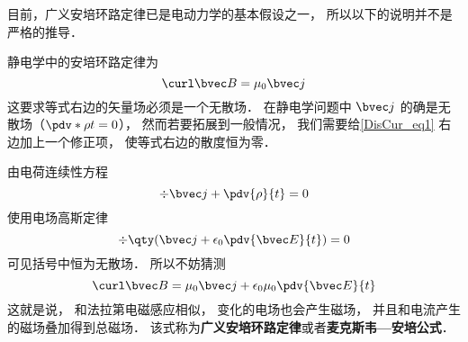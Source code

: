 目前，广义安培环路定律已是电动力学的基本假设之一， 所以以下的说明并不是严格的推导．

静电学中的安培环路定律为
\begin{equation}\label{DisCur_eq1}
\curl\bvec B = \mu_0\bvec j
\end{equation}
这要求等式右边的矢量场必须是一个无散场． 在静电学问题中 $\bvec j$ 的确是无散场（$\pdv*{\rho}{t} = 0$）， 然而若要拓展到一般情况， 我们需要给\autoref{DisCur_eq1} 右边加上一个修正项， 使等式右边的散度恒为零．

由电荷连续性方程
\begin{equation}
\div \bvec j + \pdv{\rho}{t} = 0
\end{equation}
使用电场高斯定律
\begin{equation}
\div \qty(\bvec j + \epsilon_0\pdv{\bvec E}{t}) = 0
\end{equation}
可见括号中恒为无散场． 所以不妨猜测
\begin{equation}
\curl\bvec B = \mu_0\bvec j + \epsilon_0\mu_0\pdv{\bvec E}{t}
\end{equation}
这就是说， 和法拉第电磁感应相似， 变化的电场也会产生磁场， 并且和电流产生的磁场叠加得到总磁场． 该式称为\textbf{广义安培环路定律}或者\textbf{麦克斯韦—安培公式}．
